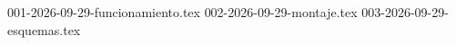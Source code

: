 \clearpage
{}
{001-2026-09-29-funcionamiento.tex}
{002-2026-09-29-montaje.tex}
{003-2026-09-29-esquemas.tex}
